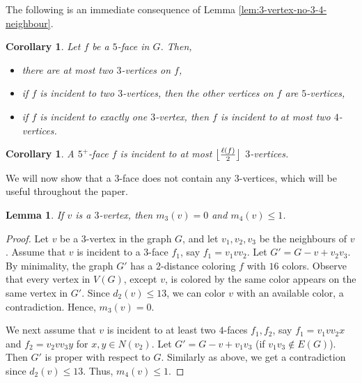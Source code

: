 \documentclass[12pt, reqno]{amsart}
\DeclarePairedDelimiter\floor{\lfloor}{\rfloor}
\theoremstyle{plain}
\newtheorem{corollary}[equation]{Corollary}
\newtheorem{lemma}[equation]{Lemma}
\theoremstyle{definition}
\numberwithin{equation}{section}
\begin{document}
The following is an immediate consequence of Lemma \ref{lem:3-vertex-no-3-4-neighbour}.


\begin{corollary}\label{cor:vertices-on-5-face}
Let $f$ be a $5$-face in $G$. Then,
\begin{itemize}
\item [$(a)$] there are at most two $3$-vertices on $f$,
\item [$(b)$] if $f$ is incident to two $3$-vertices, then the other vertices on $f$ are $5$-vertices,
\item [$(c)$] if $f$ is incident to exactly one $3$-vertex, then $f$ is incident to at most two $4$-vertices.
\end{itemize}
\end{corollary}


\begin{corollary}\label{cor:number-of-3-vert}
A $5^+$-face $f$ is incident to at most  $ \floor[\big]{\frac{\ell(f)}{2}}$  $3$-vertices.
\end{corollary}


We will now show that a $3$-face does not contain any $3$-vertices, which will be useful throughout the paper.


\begin{lemma}\label{lem:faces-in-3-face}
If $v$ is a $3$-vertex, then $m_3(v)=0$ and  $m_4(v)\leq 1$. 
\end{lemma}
\begin{proof}
Let $v$ be a $3$-vertex in the graph $G$, and let $v_1,v_2,v_3$ be the neighbours of $v$. 
Assume that $v$ is incident to a $3$-face $f_1$, say $f_1=v_1vv_2$.  Let $G'=G-v+v_2v_3$.  By minimality, the graph $G'$ has a 2-distance coloring $f$ with $16$ colors. Observe that every vertex in $V(G)$, except $v$, is colored by the same color appears on the same vertex in $G'$. Since $d_2(v)\leq 13$, we can color $v$ with an available color, a contradiction. Hence, $m_3(v)=0$.


We next assume that $v$ is incident to at least two $4$-faces  $f_1,f_2$, say $f_1=v_1vv_2x$ and $f_2=v_2vv_3y$ for $x,y\in N(v_2)$. Let $G'=G-v+v_1v_3$ (if $v_1v_3\notin E(G)$). Then $G'$ is proper with respect to $G$. Similarly as above, we get a contradiction since $d_2(v)\leq 13$. Thus, $m_4(v)\leq 1$. 
%
\end{proof}
\end{document}
